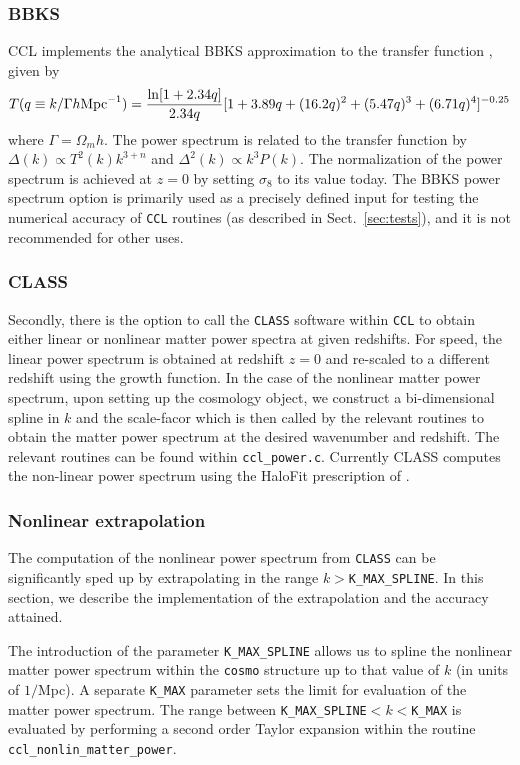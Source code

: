 \documentclass[\docopts]{\docclass}
\begin{document}
\subsubsection{BBKS}
CCL implements the analytical BBKS approximation to the transfer function \citep{BBKS}, given by
\begin{equation}
T(q\equiv k/\Gamma h {\rm Mpc}^{-1}) = \frac{\ln[1+2.34q]}{2.34q}[1+3.89q+(16.2q)^2+(5.47q)^3+(6.71q)^4]^{-0.25}
\end{equation}
where $\Gamma = \Omega_m h$.
The power spectrum is related to the transfer function by $\Delta(k)\propto T^2(k)k^{3+n}$ and $\Delta^2(k)\propto k^3P(k)$. The normalization of the power spectrum is achieved at $z=0$ by setting $\sigma_8$ to its value today. 
The BBKS power spectrum option is primarily used as a precisely defined input for testing the numerical accuracy of {\tt CCL} routines (as described in Sect.~\ref{sec:tests}), and it is not recommended for other uses.

\subsubsection{CLASS}
Secondly, there is the option to call the {\tt CLASS} software \citep{class} within {\tt CCL} to obtain either linear or nonlinear matter power spectra at given redshifts. For speed, the linear power spectrum is obtained at redshift $z=0$ and re-scaled to a different redshift using the growth function. In the case of the nonlinear matter power spectrum, upon setting up the cosmology object, we construct a bi-dimensional spline in $k$ and the scale-facor which is then called by the relevant routines to obtain the matter power spectrum at the desired wavenumber and redshift. The relevant routines can be found within {\tt ccl\_power.c}. Currently CLASS computes the non-linear power spectrum using the HaloFit prescription of \cite{CLASS_halofit}.

\subsubsection{Nonlinear extrapolation}
\label{sec:NLextrapol}

The computation of the nonlinear power spectrum from {\tt CLASS} can be significantly sped up by extrapolating in the range $k>${\tt K\_MAX\_SPLINE}. In this section, we describe the implementation of the extrapolation and the accuracy attained.

The introduction of the parameter {\tt K\_MAX\_SPLINE} allows us to spline the nonlinear matter power spectrum within the {\tt cosmo} structure up to that value of $k$ (in units of $1/$Mpc). A separate {\tt K\_MAX} parameter sets the limit for evaluation of the matter power spectrum. The range between {\tt K\_MAX\_SPLINE}$<k<${\tt K\_MAX} is evaluated by performing a second order Taylor expansion within the routine {\tt ccl\_nonlin\_matter\_power}.
\end{document}
